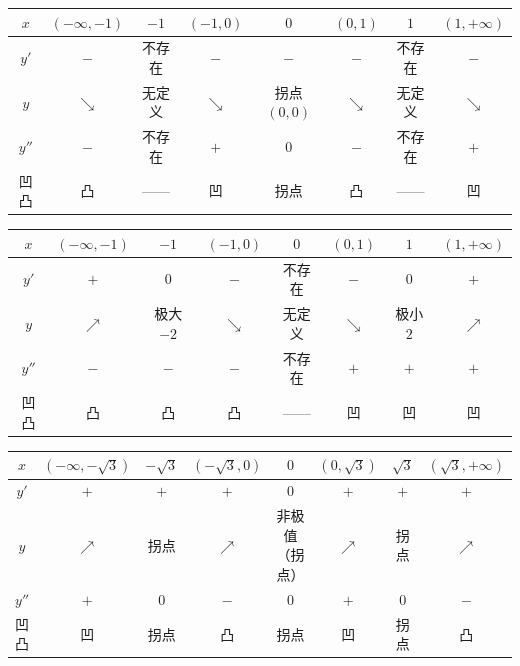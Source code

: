 \begin{center}
\footnotesize\setlength{\tabcolsep}{1.5pt}
\begin{tabular}{@{}c|ccccccc@{}}
$x$ & $(-\infty,-1)$ & $-1$ & $(-1,0)$ & $0$ & $(0,1)$ & $1$ & $(1,+\infty)$ \\
\hline
$y'$ & $-$ & 不存在 & $-$ & $-$ & $-$ & 不存在 & $-$ \\
$y$ & $\searrow$ & 无定义 & $\searrow$ & 拐点 $(0,0)$ & $\searrow$ & 无定义 & $\searrow$ \\
$y''$ & $-$ & 不存在 & $+$ & $0$ & $-$ & 不存在 & $+$ \\
凹凸 & 凸 & —— & 凹 & 拐点 & 凸 & —— & 凹 \\
\end{tabular}
\end{center}

\begin{center}
\footnotesize\setlength{\tabcolsep}{1.5pt}
\begin{tabular}{@{}c|ccccccc@{}}
$x$ & $(-\infty,-1)$ & $-1$ & $(-1,0)$ & $0$ & $(0,1)$ & $1$ & $(1,+\infty)$ \\
\hline
$y'$ & $+$ & $0$ & $-$ & 不存在 & $-$ & $0$ & $+$ \\
$y$ & $\nearrow$ & 极大 $-2$ & $\searrow$ & 无定义 & $\searrow$ & 极小 $2$ & $\nearrow$ \\
$y''$ & $-$ & $-$ & $-$ & 不存在 & $+$ & $+$ & $+$ \\
凹凸 & 凸 & 凸 & 凸 & —— & 凹 & 凹 & 凹 \\
\end{tabular}
\end{center}

\begin{center}
\footnotesize\setlength{\tabcolsep}{1.5pt}
\begin{tabular}{@{}c|ccccccc@{}}
$x$ & $(-\infty,-\sqrt3)$ & $-\sqrt3$ & $(-\sqrt3,0)$ & $0$ & $(0,\sqrt3)$ & $\sqrt3$ & $(\sqrt3,+\infty)$ \\
\hline
$y'$ & $+$ & $+$ & $+$ & $0$ & $+$ & $+$ & $+$ \\
$y$ & $\nearrow$ & 拐点 & $\nearrow$ & 非极值（拐点） & $\nearrow$ & 拐点 & $\nearrow$ \\
$y''$ & $+$ & $0$ & $-$ & $0$ & $+$ & $0$ & $-$ \\
凹凸 & 凹 & 拐点 & 凸 & 拐点 & 凹 & 拐点 & 凸 \\
\end{tabular}
\end{center}

